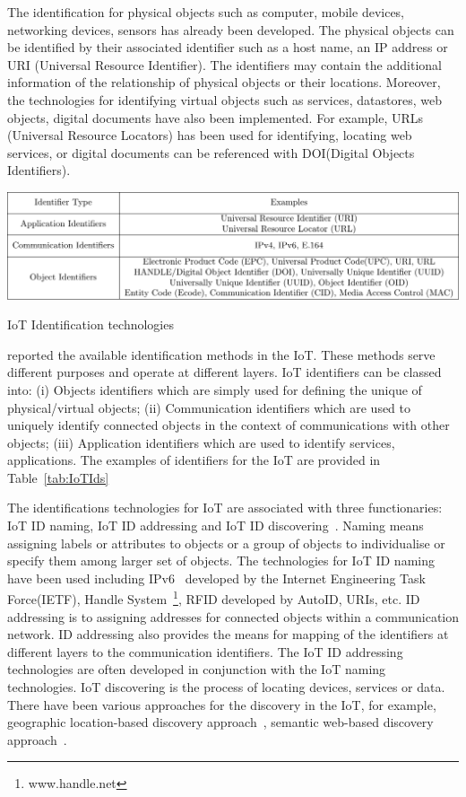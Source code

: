 The identification for physical objects such as computer, mobile devices, networking devices, sensors has already been developed.
The physical objects can be identified by their associated identifier such as a host name, an IP address or URI (Universal Resource Identifier).
The identifiers may contain the additional information of the relationship of physical objects or their locations.
Moreover, the technologies for identifying virtual objects such as services, datastores, web objects, digital documents have also been implemented.
For example, URLs (Universal Resource Locators) has been used for identifying, locating web services, or digital documents can be referenced with DOI(Digital Objects Identifiers).

\begin{table}[ht!]
    \centering
    \includegraphics[scale=.85]{Table/2-1-identfication.pdf}
    \caption{IoT Identification technologies}
    \label{tab:IoTIds}
\end{table}

\cite{Soldatos:2014} reported the available identification methods in the IoT. 
These methods serve different purposes and operate at different layers.
IoT identifiers can be classed into: 
(i) Objects identifiers which are simply used for defining the unique of physical/virtual objects;
(ii) Communication identifiers which are used to uniquely identify connected objects in the context of communications with other objects;
(iii) Application identifiers which are used to identify services, applications. 
The examples of identifiers for the IoT are provided in Table~\ref{tab:IoTIds}

The identifications technologies for IoT are associated with three functionaries: IoT ID naming, IoT ID addressing and IoT ID discovering~\citep{Soldatos:2014}.
Naming means assigning labels or attributes to objects or a group of objects to individualise or specify them among larger set of objects.
The technologies for IoT ID naming have been used including IPv6~\citep{Deering:2017} developed by the Internet Engineering Task Force(IETF), Handle System~\footnote{www.handle.net}, RFID developed by AutoID, URIs, etc.
ID addressing is to assigning addresses for connected objects within a communication network.
ID addressing also provides the means for mapping of the identifiers at different layers to the communication identifiers.
The IoT ID addressing technologies are often developed in conjunction with the IoT naming technologies.
IoT discovering is the process of locating devices, services or data. 
There have been various approaches for the discovery in the IoT, for example, geographic location-based discovery approach~\citep{Dinh:2017}, semantic web-based discovery approach~\citep{Chun:2015, Serena:2017}.

